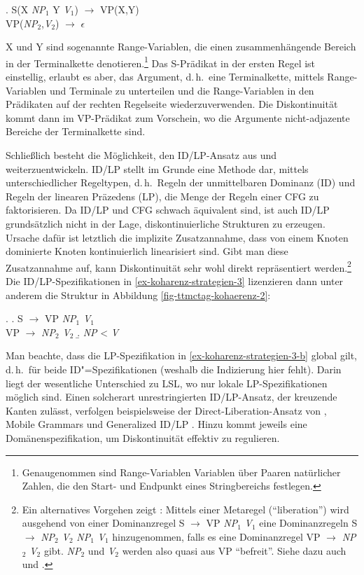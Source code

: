 \ex. \label{ex-koharenz-strategien-2}
S(X {\it NP$_1$} Y {\it V$_1$}) $\to$ VP(X,Y) \\
VP({\it NP$_2$},{\it V$_2$}) $\to$ $\epsilon$
 
X und Y sind sogenannte Range-Variablen, die einen zusammenhängende Bereich in der Terminalkette denotieren.\footnote{Genaugenommen sind Range-Variablen Variablen über Paaren natürlicher Zahlen, die den Start- und Endpunkt eines Stringbereichs festlegen.} Das S-Prädikat in der ersten Regel ist einstellig, erlaubt es aber, das Argument, d.\,h.\ eine Terminalkette, mittels Range-Variablen und Terminale zu unterteilen und die Range-Variablen in den Prädikaten auf der rechten Regelseite wiederzuverwenden. Die Diskontinuität kommt dann im VP-Prädikat zum Vorschein, wo die Argumente nicht-adjazente Bereiche der Terminalkette sind.

Schlie\ss lich besteht die Möglichkeit, den ID/LP-Ansatz aus \cite{Gazdar:Pullum:81} und \cite{Shieber:84} weiterzuentwickeln. ID/LP stellt im Grunde eine Methode dar, mittels unterschiedlicher Regeltypen, d.\,h.\ Regeln der unmittelbaren Dominanz (ID) und Regeln der linearen Präzedens (LP), die Menge der Regeln einer CFG zu faktorisieren. Da ID/LP und CFG schwach äquivalent sind, ist auch ID/LP grundsätzlich nicht in der Lage, diskontinuierliche Strukturen zu erzeugen. Ursache dafür ist letztlich die implizite Zusatzannahme, dass von einem Knoten dominierte Knoten kontinuierlich linearisiert sind. Gibt man diese Zusatzannahme auf, kann Diskontinuität sehr wohl direkt repräsentiert werden.\footnote{Ein alternatives Vorgehen zeigt \cite{Pullum:82}: Mittels einer Metaregel ("`liberation"') wird ausgehend von einer Dominanzregel S $\to$ VP {\it NP$_1$} {\it V$_1$} eine Dominanzregeln S $\to$ {\it NP$_2$} {\it V$_2$} {\it NP$_1$} {\it V$_1$} hinzugenommen, falls es eine Dominanzregel VP $\to$ {\it NP$_2$} {\it V$_2$} gibt. {\it NP$_2$} und {\it V$_2$} werden also quasi aus VP "`befreit"'. Siehe dazu auch \citet[81f]{Kathol:95} und \citet[32f]{Kathol:00}.} Die ID/LP-Spezifikationen in \ref{ex-koharenz-strategien-3} lizenzieren dann unter anderem die Struktur in Abbildung \ref{fig-ttmctag-kohaerenz-2}: 

\ex. \label{ex-koharenz-strategien-3} 
\a. S $\to$ VP {\it NP$_1$} {\it V$_1$} \\
VP $\to$ {\it NP$_2$} {\it V$_2$}
\b. \label{ex-koharenz-strategien-3-b} {\it NP} < {\it V}

Man beachte, dass die LP-Spezifikation in \ref{ex-koharenz-strategien-3-b} global gilt, d.\,h.\ für beide ID"=Spezifikationen (weshalb die Indizierung hier fehlt). Darin liegt der wesentliche Unterschied zu LSL, wo nur lokale LP-Spezifikationen möglich sind. Einen solcherart unrestringierten ID/LP-Ansatz, der kreuzende Kanten zulässt, verfolgen  beispielsweise der Direct-Liberation-Ansatz von \cite{Zwicky:86}, Mobile Grammars \citep{Blevins:90} und Generalized ID/LP \citep{Daniels:05}. Hinzu kommt jeweils eine Domänenspezifikation, um Diskontinuität effektiv zu regulieren.

